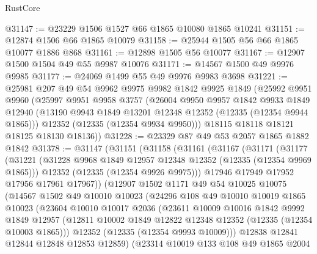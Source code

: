 \begin{lexlean}{RustCore}
\begin{coremodule}
@31147 := @23229 @1506 @1527 @66 @1865 @10080 @1865 @10241
@31151 := @12874 @1506 @66 @1865 @10079
@31158 := @25944 @1505 @56 @66 @1865 @10077 @1886 @868
@31161 := @12898 @1505 @56 @10077
@31167 := @12907 @1500 @1504 @49 @55 @9987 @10076
@31171 := @14567 @1500 @49 @9976 @9985
@31177 := @24069 @1499 @55 @49 @9976 @9983 @3698
@31221 := @25981
    @207
    @49
    @54
    @9962
    @9975
    @9982
    @1842
    @9925
    @1849
    (@25992
      @9951
      @9960
      (@25997
        @9951
        @9958
        @3757
        (@26004
          @9950
          @9957
          @1842
          @9933
          @1849
          @12940
          (@13190 @9943 @1849 @13201 @12348 @12352 (@12335 (@12354 @9944 @1865)))
          @12352
          (@12335 (@12354 @9934 @9950)))
        @18115
        @18118
        @18121
        @18125
        @18130
        @18136))
@31228 := @23329 @87 @49 @53 @2057 @1865 @1882 @1842
@31378 := @31147
    (@31151
      (@31158
        (@31161
          (@31167
            (@31171
              (@31177
                (@31221
                  (@31228 @9968 @1849 @12957 @12348 @12352 (@12335 (@12354 @9969 @1865)))
                  @12352
                  (@12335 (@12354 @9926 @9975)))
                @17946
                @17949
                @17952
                @17956
                @17961
                @17967))
            (@12907
              @1502
              @1171
              @49
              @54
              @10025
              @10075
              (@14567
                @1502
                @49
                @10010
                @10023
                (@24296
                  @108
                  @49
                  @10010
                  @10019
                  @1865
                  @10023
                  (@23604
                    @10010
                    @10017
                    @2036
                    (@23611
                      @10009
                      @10016
                      @1842
                      @9992
                      @1849
                      @12957
                      (@12811 @10002 @1849 @12822 @12348 @12352 (@12335 (@12354 @10003 @1865)))
                      @12352
                      (@12335 (@12354 @9993 @10009)))
                    @12838
                    @12841
                    @12844
                    @12848
                    @12853
                    @12859)
                  (@23314
                    @10019
                    @133
                    @108
                    @49
                    @1865
                    @2004

\end{coremodule}
\end{lexlean}
